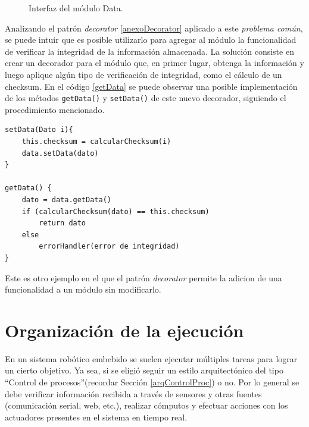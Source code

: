 \begin{figure}[H]
\caption{Interfaz del módulo Data.}
\label{dataInter}
\begin{center}
\end{center}
\end{figure}

Analizando el patrón \textit{decorator} \ref{anexoDecorator} aplicado a este \textit{problema común}, se puede intuir que es posible utilizarlo para agregar al módulo \Data la funcionalidad de verificar la integridad de la información almacenada. La solución consiste en crear un decorador para el módulo \Data que, en primer lugar, obtenga la información y luego aplique algún tipo de verificación de integridad, como el cálculo de un \gls{checksum}. En el código \ref{getData} se puede observar una posible implementación de los métodos \verb|getData()| y \verb|setData()| de este nuevo decorador, siguiendo el procedimiento mencionado.

\begin{lstlisting}[caption=Implementación de los métodos getData y setData del decorador que se encarga de verificar la integridad de la información almacenada en el módulo \Data.,label={getData}]
setData(Dato i){
    this.checksum = calcularChecksum(i)
    data.setData(dato)
}

getData() {
    dato = data.getData()
    if (calcularChecksum(dato) == this.checksum)
        return dato
    else
        errorHandler(error de integridad)
}
\end{lstlisting}

Este es otro ejemplo en el que el patrón \textit{decorator} permite la adicion de una funcionalidad a un módulo sin modificarlo.


\section{Organización de la ejecución}
\label{orgEjecucion}

En un sistema robótico embebido se suelen ejecutar múltiples tareas para lograr un cierto objetivo. Ya sea, si se eligió seguir un estilo arquitectónico del tipo ``Control de procesos''(recordar Sección \ref{arqControlProc}) o no. Por lo general se debe verificar información recibida a través de sensores y otras fuentes (comunicación serial, web, etc.), realizar cómputos y efectuar acciones con los actuadores presentes en el sistema en tiempo real.

